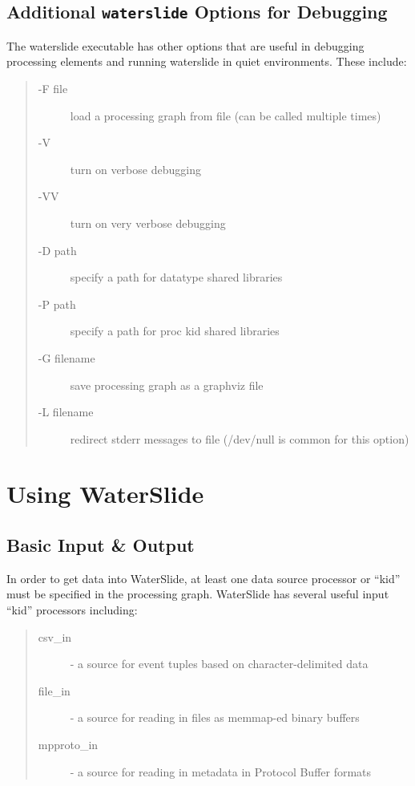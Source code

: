 \documentclass[11pt]{article}
\begin{document}
\subsection{Additional \texttt{waterslide} Options for Debugging}
The waterslide executable has other options that are useful in debugging processing elements and
running waterslide in quiet environments.  These
include:
\begin{quote}
\begin{description}
\item [-F file] load a processing graph from file (can be called multiple times)
\item [-V] turn on verbose debugging
\item [-VV] turn on very verbose debugging
\item [-D path] specify a path for datatype shared libraries 
\item [-P path] specify a path for proc kid shared libraries 
\item [-G filename] save processing graph as a graphviz file
\item [-L filename] redirect stderr messages to file (/dev/null is common for this option)
\end{description}
\end{quote}

\section {Using WaterSlide}
\subsection {Basic Input \& Output}
In order to get data into WaterSlide, at least one data source processor 
or ``kid'' must be specified in the processing graph.  WaterSlide has 
several useful input ``kid'' processors including:

\begin{quote}
\begin{description}
\item [csv\_in] - a source for event tuples based on character-delimited data
\item [file\_in] - a source for reading in files as memmap-ed binary buffers
\item [mpproto\_in] - a source for reading in metadata in Protocol Buffer formats
\end{description}
\end{quote}
\end{document}
